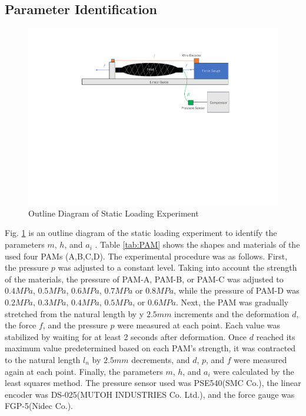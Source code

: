 \subsection{Parameter Identification}

\begin{figure}[h]
    \centering
    \includegraphics[width=\columnwidth]{fig/static_experiment.pdf}
    \caption{Outline Diagram of Static Loading Experiment}
    \label{fig:static_equipment}
 \end{figure}

Fig. \ref{fig:static_equipment} is an outline diagram of the static loading experiment to identify the parameters $m$, $h$, and $a_i$ .
Table \ref{tab:PAM} shows the shapes and materials of the used four PAMs (A,B,C,D).
The experimental procedure was as follows.
First, the pressure $p$ was adjusted to a constant level.
Taking into account the strength of the materials, the pressure of PAM-A, PAM-B, or PAM-C was adjusted to $0.4\si{MPa}$, $0.5\si{MPa}$, $0.6\si{MPa}$, $0.7\si{MPa}$ or $0.8\si{MPa}$, while the pressure of PAM-D was $0.2\si{MPa}$, $0.3\si{MPa}$, $0.4\si{MPa}$, $0.5\si{MPa}$, or $0.6\si{MPa}$.
Next, the PAM was gradually stretched from the natural length by y $2.5\si{mm}$ increments and the deformation $d$, the force $f$, and the pressure $p$ were measured at each point.
Each value was stabilized by waiting for at least 2 seconds after deformation.
Once $d$ reached its maximum value predetermined based on each PAM's strength, it was contracted to the natural length $l_n$ by  $2.5\si{mm}$ decrements, and $d$, $p$, and $f$ were measured again at each point.
Finally, the parameters $m$, $h$, and $a_i$ were calculated by the least squares method.
The pressure sensor used was PSE540(SMC Co.), the linear encoder was DS-025(MUTOH INDUSTRIES Co. Ltd.), and the force gauge was FGP-5(Nidec Co.).

